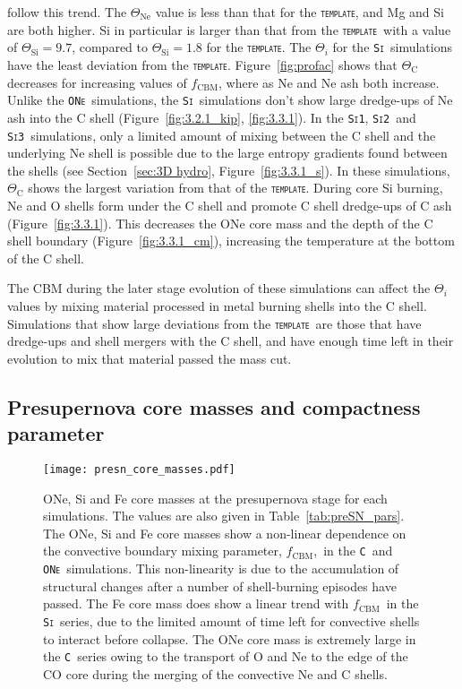 \documentclass[useAMS,usenatbib]{mn2e}
\newcommand{\fcbm}{\ensuremath{f_\mathrm{CBM}}}
\newcommand{\template}{\textsc{\texttt{template}}}
\newcommand{\Sia}{\textsc{\texttt{Si1}}}
\newcommand{\Sib}{\textsc{\texttt{Si2}}}
\newcommand{\Sic}{\textsc{\texttt{Si3}}}
\newcommand{\C}{\textsc{\texttt{C}}}
\newcommand{\ONe}{\textsc{\texttt{ONe}}}
\newcommand{\Si}{\textsc{\texttt{Si}}}
\begin{document}
follow this trend. The $\Theta_{\mathrm{Ne}}$ value is less than that for the
\template, and Mg and Si are both higher. Si in particular is larger than that from the \template\ with a value of $\Theta_{\mathrm{Si}} = 9.7$, compared to $\Theta_{\mathrm{Si}} = 1.8$ for the \template. The $\Theta_{i}$ for the
\Si\ simulations have the least deviation from the \template.
Figure~\ref{fig:profac} shows that $\Theta_{\mathrm{C}}$ decreases for
increasing values of \fcbm, where as Ne and Ne ash both increase. Unlike the
\ONe\ simulations, the \Si\ simulations don't show large dredge-ups of Ne ash
into the C shell (Figure~\ref{fig:3.2.1_kip}, \ref{fig:3.3.1}). In the \Sia,
\Sib\ and \Sic\ simulations, only a limited amount of mixing between the C
shell and the underlying Ne shell is possible due to the large entropy
gradients found between the shells (see Section~\ref{sec:3D hydro},
Figure~\ref{fig:3.3.1_s}). In these simulations, $\Theta_{\mathrm{C}}$ shows the
largest variation from that of the \template. During core Si burning, Ne and O
shells form under the C shell and promote C shell dredge-ups of C ash
(Figure~\ref{fig:3.3.1}). This decreases the ONe core mass and the depth of the
C shell boundary (Figure~\ref{fig:3.3.1_cm}), increasing the temperature at the
bottom of the C shell.

The CBM during the later stage evolution of these simulations can affect the
$\Theta_{i}$ values by mixing material processed in metal burning shells into the
C shell. Simulations that show large deviations from the \template\ are those
that have dredge-ups and shell mergers with the C shell, and have enough time
left in their evolution to mix that material passed the mass cut. 


\subsection{Presupernova core masses and compactness parameter} \label{sec: compactness}

\begin{figure}
	\texttt{[image: presn\_core\_masses.pdf]}
	\caption{
		ONe, Si and Fe core masses at the presupernova stage for 
		each simulations. The values 
		are also given in Table~\ref{tab:preSN_pars}. 
		The ONe, Si and Fe core masses show a non-linear 
		dependence on the convective boundary mixing parameter, 
		\fcbm,~in the \C~and \ONe~simulations. This non-linearity is due 
		to the accumulation of structural changes after a number of shell-burning 
		episodes have passed. The Fe core mass does show a linear trend with 
		\fcbm~in the \Si~series, due to the limited amount of time left for 
		convective shells to interact before collapse. The ONe core mass is 
		extremely large in the \C~series owing to the transport of O and 
		Ne to the edge of the CO core during the merging of the convective 
		Ne and C shells.
	}
	\label{fig: presn-core-masses} %
\end{figure}
\end{document}

